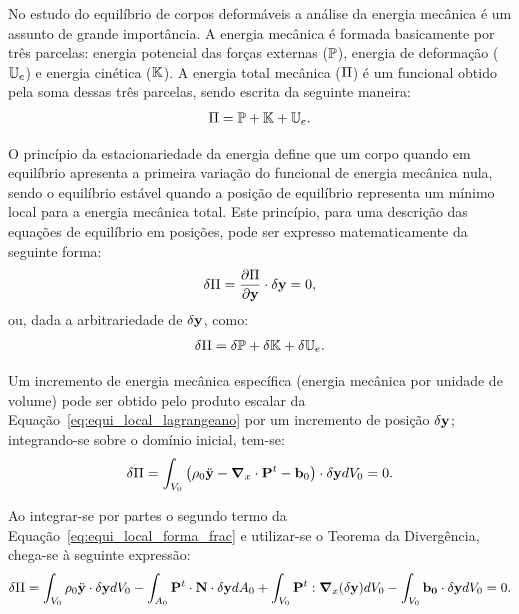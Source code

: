 No estudo do equilíbrio de corpos deformáveis a análise da energia mecânica é um assunto de grande importância. A energia mecânica é formada basicamente por três parcelas: energia potencial das forças externas ($\mathbb{P}$), energia de deformação ($\mathbb{U}_e$) e energia cinética ($\mathbb{K}$). A energia total mecânica ($\Pi$) é um funcional obtido pela soma dessas três parcelas, sendo escrita da seguinte maneira:
\begin{align}
	\Pi = \mathbb{P} + \mathbb{K} + \mathbb{U}_e.
\end{align}

O princípio da estacionariedade da energia define que um corpo quando em equilíbrio apresenta a primeira variação do funcional de energia mecânica nula, sendo o equilíbrio estável quando a posição de equilíbrio representa um mínimo local para a energia mecânica total. Este princípio, para uma descrição das equações de equilíbrio em posições, pode ser expresso matematicamente da seguinte forma:
\begin{align}
	\delta\Pi = \frac{\partial{\Pi}}{\partial{\mathbf{y}}} \cdot \delta\mathbf{y} = 0, \label{eq:princ_esta}
\end{align}
\noindent ou, dada a arbitrariedade de $\delta\mathbf{y}$, como: 
\begin{align}
	\delta\Pi = \delta\mathbb{P} + \delta\mathbb{K} + \delta\mathbb{U}_e.
\end{align}

Um incremento de energia mecânica específica (energia mecânica por unidade de volume) pode ser obtido pelo produto escalar da Equação~\eqref{eq:equi_local_lagrangeano} por um incremento de posição $\delta\mathbf{y}$; integrando-se sobre o domínio inicial, tem-se:
\begin{align}
	\delta\Pi = \int_{V_0} \left(\rho_0 \ddot{\mathbf{y}} - \boldsymbol{\nabla}_x \cdot \mathbf{P}^t -  \mathbf{b}_0 \right) \cdot  \delta\mathbf{y} dV_0 = 0. \label{eq:equi_local_forma_frac}
\end{align}

Ao integrar-se por partes o segundo termo da Equação~\eqref{eq:equi_local_forma_frac} e utilizar-se o Teorema da Divergência, chega-se à seguinte expressão:
\begin{align}
	\delta\Pi = \int_{V_0} \rho_0 \ddot{\mathbf{y}} \cdot \delta\mathbf{y} dV_0 - \int_{A_0} \mathbf{P}^t \cdot \mathbf{N} \cdot  \delta\mathbf{y} dA_0  + \int_{V_0} \mathbf{P}^t : \boldsymbol{\nabla}_x(\delta\mathbf{y}) dV_0 - \int_{V_0} \mathbf{b_0} \cdot \delta \mathbf{y} dV_0 = 0. \label{eq:equi_local_forma_frac2}
\end{align}

